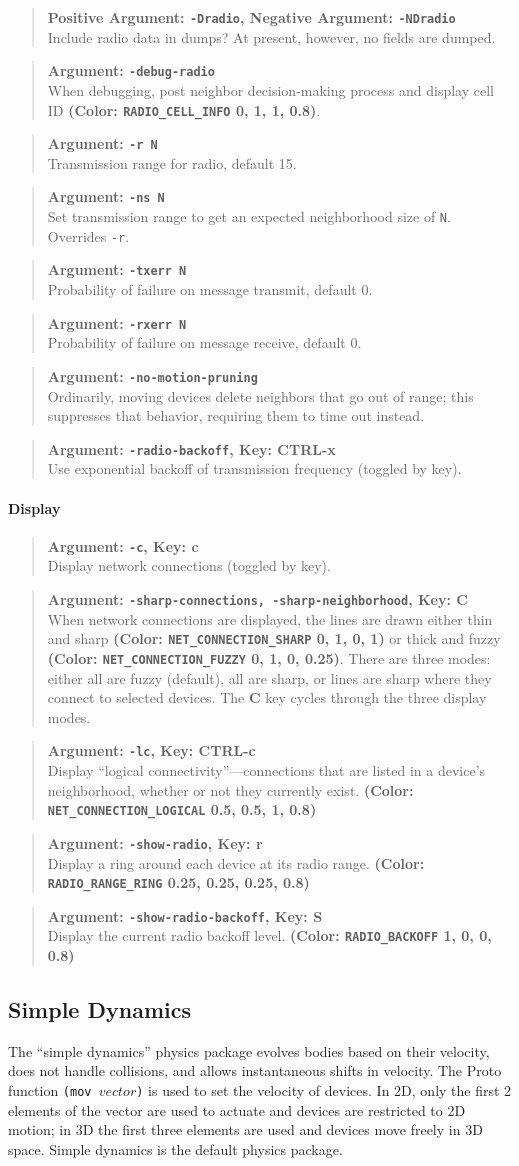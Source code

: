 \documentclass{article}
\newcommand\var[1]{{\tt #1}}
\newcommand\key[1]{{\bf #1}}
\newcommand\simarg[2]{\begin{quote} {\bf Argument: \var{#1}} \\ #2 \end{quote}}
\newcommand\simargkey[3]{
  \begin{quote} {\bf Argument: \var{#1}, Key: \key{#2}} \\ #3 \end{quote}
}
\newcommand\simPMarg[3]{
  \begin{quote}
    {\bf Positive Argument: \var{#1}, Negative Argument: \var{#2}} \\ #3
  \end{quote}
}
\newcommand\color[5]{{\bf (Color: {\tt #1} #2, #3, #4, #5)}} %
\begin{document}
\simPMarg{-Dradio}{-NDradio}{Include radio data in dumps?  At present,
    however, no fields are dumped.}

\simarg{-debug-radio}{When debugging, post neighbor decision-making
  process and display cell ID
  \color{RADIO\_CELL\_INFO}{0}{1}{1}{0.8}.}

\simarg{-r N}{Transmission range for radio, default 15.}
\simarg{-ns N}{Set transmission range to get an expected neighborhood
  size of \var{N}.  Overrides \var{-r}.}
\simarg{-txerr N}{Probability of failure on message transmit, default 0.}
\simarg{-rxerr N}{Probability of failure on message receive, default 0.}

\simarg{-no-motion-pruning}{Ordinarily, moving devices delete
  neighbors that go out of range; this suppresses that behavior,
  requiring them to time out instead.}

\simargkey{-radio-backoff}{CTRL-x}{Use exponential backoff of
  transmission frequency (toggled by key).}

\paragraph{Display}
\simargkey{-c}{c}{Display network connections (toggled by key).}
\simargkey{-sharp-connections, -sharp-neighborhood}{C}{When network 
  connections are displayed, the lines are drawn either thin and sharp
  \color{NET\_CONNECTION\_SHARP}{0}{1}{0}{1} or thick and fuzzy
  \color{NET\_CONNECTION\_FUZZY}{0}{1}{0}{0.25}.  There are three modes:
  either all are fuzzy (default), all are sharp, or lines are sharp where
  they connect to selected devices.  The \key{C} key cycles through the
  three display modes.}
\simargkey{-lc}{CTRL-c}{Display ``logical connectivity''---connections
  that are listed in a device's neighborhood, whether or not they currently
  exist.  \color{NET\_CONNECTION\_LOGICAL}{0.5}{0.5}{1}{0.8}}
\simargkey{-show-radio}{r}{Display a ring around each device at its radio
  range. \color{RADIO\_RANGE\_RING}{0.25}{0.25}{0.25}{0.8}}
\simargkey{-show-radio-backoff}{S}{Display the current radio backoff level.
  \color{RADIO\_BACKOFF}{1}{0}{0}{0.8}}


\subsection{Simple Dynamics}

The ``simple dynamics'' physics package evolves bodies based on their
velocity, does not handle collisions, and allows instantaneous shifts
in velocity.  The Proto function \var{(mov $vector$)} is used to set
the velocity of devices.  In 2D, only the first 2 elements of the
vector are used to actuate and devices are restricted to 2D motion; in
3D the first three elements are used and devices move freely in 3D
space.  Simple dynamics is the default physics package.
\end{document}
